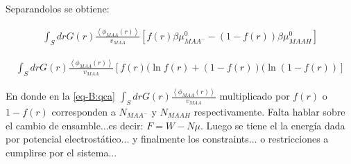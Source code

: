 Separandolos se obtiene:

\begin{align}    
	\int_S drG(r)\frac{\left<\phi_{MAA}(r)\right>}{v_{MAA}}\left[ f(r)\beta\mu^0_{MAA^-} -(1-f(r))\beta\mu^0_{MAAH} \right]
	\label{eq-B:qca}
\end{align}

\begin{align}
	\int_S drG(r)\frac{\left<\phi_{MAA}(r)\right>}{v_{MAA}} \left[f(r)(\ln f(r)+(1-f(r))(\ln(1-f(r))\right] 
	\label{eq-B:traslacion}
\end{align}    

En donde en la \ref{eq-B:qca} $\int_S drG(r)\frac{\left<\phi_{MAA}(r)\right>}{v_{MAA}}$ multiplicado por $f(r)$ o $1-f(r)$ corresponden a $N_{MAA^-}$ y $N_{MAAH}$ respectivamente.
Falta hablar sobre el cambio de ensamble...es decir: $F= W -N\mu$.
Luego se tiene el la energ\'ia dada por potencial electrost\'atico... y finalmente los constraints... o restricciones a cumplirse por el sistema...   
